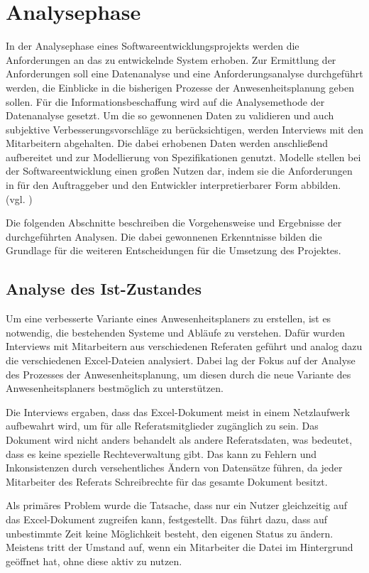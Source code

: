 \section{Analysephase}
\label{sec:Analysephase}
In der Analysephase eines Softwareentwicklungsprojekts werden die Anforderungen an das zu entwickelnde System erhoben. Zur Ermittlung der Anforderungen soll eine Datenanalyse und eine Anforderungsanalyse durchgeführt werden, die Einblicke in die bisherigen Prozesse der Anwesenheitsplanung geben sollen. Für die Informationsbeschaffung wird auf die Analysemethode der Datenanalyse gesetzt. Um die so gewonnenen Daten zu validieren und auch subjektive Verbesserungsvorschläge zu berücksichtigen, werden Interviews mit den Mitarbeitern abgehalten. Die dabei erhobenen Daten werden anschließend aufbereitet und zur Modellierung von Spezifikationen genutzt. Modelle stellen bei der Softwareentwicklung einen großen Nutzen dar, indem sie die Anforderungen in für den Auftraggeber und den Entwickler interpretierbarer Form abbilden. (vgl. \cite[S. 43]{dumke-2003})

Die folgenden Abschnitte beschreiben die Vorgehensweise und Ergebnisse der durchgeführten Analysen. Die dabei gewonnenen Erkenntnisse bilden die Grundlage für die weiteren Entscheidungen für die Umsetzung des Projektes.


\subsection{Analyse des Ist-Zustandes}
\label{sec:Ist-Zustand}
Um eine verbesserte Variante eines Anwesenheitsplaners zu erstellen, ist es notwendig, die bestehenden Systeme und Abläufe zu verstehen. Dafür wurden Interviews mit Mitarbeitern aus verschiedenen Referaten geführt und analog dazu die verschiedenen Excel-Dateien analysiert. Dabei lag der Fokus auf der Analyse des Prozesses der Anwesenheitsplanung, um diesen durch die neue Variante des Anwesenheitsplaners bestmöglich zu unterstützen.

Die Interviews ergaben, dass das Excel-Dokument meist in einem Netzlaufwerk aufbewahrt wird, um für alle Referatsmitglieder zugänglich zu sein. Das Dokument wird nicht anders behandelt als andere Referatsdaten, was bedeutet, dass es keine spezielle Rechteverwaltung gibt. Das kann zu Fehlern und Inkonsistenzen durch versehentliches Ändern von Datensätze führen, da jeder Mitarbeiter des Referats Schreibrechte für das gesamte Dokument besitzt.

Als primäres Problem wurde die Tatsache, dass nur ein Nutzer gleichzeitig auf das Excel-Dokument zugreifen kann, festgestellt. Das führt dazu, dass auf unbestimmte Zeit keine Möglichkeit besteht, den eigenen Status zu ändern. Meistens tritt der Umstand auf, wenn ein Mitarbeiter die Datei im Hintergrund geöffnet hat, ohne diese aktiv zu nutzen.


